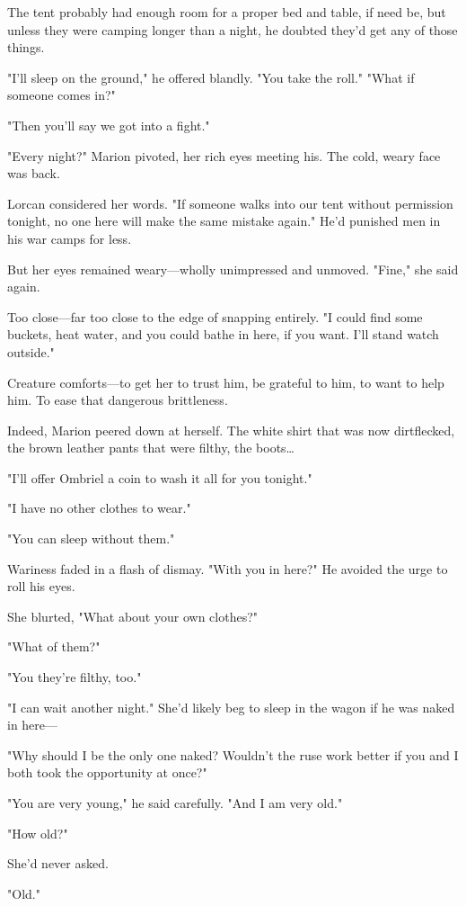 The tent probably had enough room for a proper bed and table, if need be, but unless they were camping longer than a night, he doubted they'd get any of those things.

"I'll sleep on the ground," he offered blandly. "You take the roll." "What if someone comes in?"

"Then you'll say we got into a fight."

"Every night?" Marion pivoted, her rich eyes meeting his. The cold, weary face was back.

Lorcan considered her words. "If someone walks into our tent without permission tonight, no one here will make the same mistake again." He'd punished men in his war camps for less.

But her eyes remained weary---wholly unimpressed and unmoved. "Fine," she said again.

Too close---far too close to the edge of snapping entirely. "I could find some buckets, heat water, and you could bathe in here, if you want. I'll stand watch outside."

Creature comforts---to get her to trust him, be grateful to him, to want to help him. To ease that dangerous brittleness.

Indeed, Marion peered down at herself. The white shirt that was now dirtflecked, the brown leather pants that were filthy, the boots\ldots{}

"I'll offer Ombriel a coin to wash it all for you tonight."

"I have no other clothes to wear."

"You can sleep without them."

Wariness faded in a flash of dismay. "With you in here?" He avoided the urge to roll his eyes.

She blurted, "What about your own clothes?"

"What of them?"

"You  they're filthy, too."

"I can wait another night." She'd likely beg to sleep in the wagon if he was naked in here---

"Why should I be the only one naked? Wouldn't the ruse work better if you and I both took the opportunity at once?"

"You are very young," he said carefully. "And I am very old."

"How old?"

She'd never asked.

"Old."

